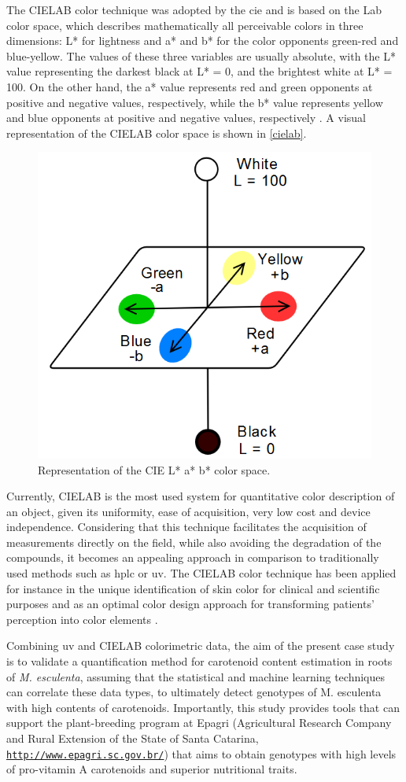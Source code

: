 The CIELAB color technique was adopted by the \gls{cie} and is based on the Lab color space, which describes mathematically all perceivable colors in three dimensions: L* for lightness and a* and b* for the color opponents green-red and blue-yellow. The values of these three variables are usually absolute, with the L* value representing the darkest black at L* = 0, and the brightest white at L* = 100. On the other hand, the a* value represents red and green opponents at positive and negative values, respectively, while the b* value represents yellow and blue opponents at positive and negative values, respectively \citep{brockes1982evaluation, schanda2007colorimetry}. A visual representation of the CIELAB color space is shown in \autoref{cielab}.

\begin{figure}[h]
	\centering
	\includegraphics[width=0.4\linewidth]{Imagens/cielab}
	\caption{Representation of the CIE L* a* b* color space.}
	\label{cielab}
\end{figure}

Currently, CIELAB is the most used system for quantitative color description of an object, given its uniformity, ease of acquisition, very low cost and device independence. Considering that this technique facilitates the acquisition of measurements directly on the field, while also avoiding the degradation of the compounds, it becomes an appealing approach in comparison to traditionally used methods such as \gls{hplc} or \gls{uv}. The CIELAB color technique has been applied for instance in the unique identification of skin color for clinical and scientific purposes \citep{weatherall1992skin} and as an optimal color design approach for transforming patients' perception into color elements \citep{liu2014optimal}.

Combining \gls{uv} and CIELAB colorimetric data, the aim of the present case study is to validate a quantification method for carotenoid content estimation in roots of \textit{M. esculenta}, assuming that the statistical and machine learning techniques can correlate these data types, to ultimately detect genotypes of M. esculenta with high contents of carotenoids. Importantly, this study provides tools that can support the plant-breeding program at Epagri (Agricultural Research Company and Rural Extension of the State of Santa Catarina, \href{http://www.epagri.sc.gov.br/}{\nolinkurl{http://www.epagri.sc.gov.br/}}) that aims to obtain genotypes with high levels of pro-vitamin A carotenoids and superior nutritional traits.

